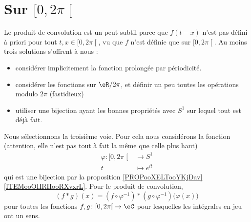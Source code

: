 \section{Sur \( \mathopen[ 0 , 2\pi \mathclose[\)}

Le produit de convolution est un peut subtil parce que \( f(t-x)\) n'est pas défini à priori pour tout \( t,x\in \mathopen[ 0 , 2\pi \mathclose[\), vu que \( f\) n'est définie que sur \( \mathopen[ 0 , 2\pi \mathclose[\). Au moins trois solutions s'offrent à nous :
\begin{itemize}
	\item
	      considérer implicitement la fonction prolongée par périodicité.
	\item
	      considérer les fonctions sur \( \eR/2\pi\), et définir un peu toutes les opérations modulo \( 2\pi\) (fastidieux)
	\item
	      utiliser une bijection ayant les bonnes propriétés avec \( S^1\) sur lequel tout est déjà fait.
\end{itemize}
Nous sélectionnons la troisième voie. Pour cela nous considérons la fonction (attention, elle n'est pas tout à fait la même que celle plus haut)
\begin{equation}
	\begin{aligned}
		\varphi\colon \mathopen[ 0 , 2\pi \mathclose[ & \to S^1         \\
		t                                             & \mapsto  e^{it}
	\end{aligned}
\end{equation}
qui est une bijection par la proposition \ref{PROPooXELTooYKjDav}\ref{ITEMooOHRHooRXvxrL}. Pour le produit de convolution,
\begin{equation}
	(f * g)(x)=(f\circ \varphi^{-1})*(g\circ\varphi^{-1})\big( \varphi(x) \big)
\end{equation}
pour toutes les fonctions \( f,g\colon \mathopen[ 0 , 2\pi \mathclose[\to \eC\) pour lesquelles les intégrales en jeu ont un sens.
